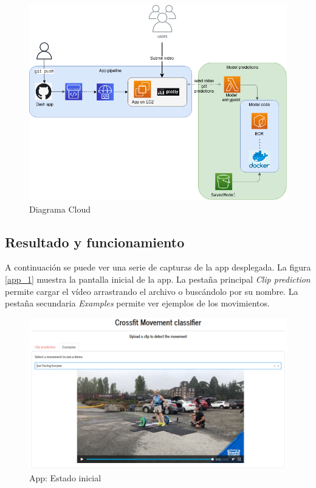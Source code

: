 \begin{figure}[H]
    \centering
		\includegraphics[width=\textwidth]{figs/cloud_diagram.png}
\caption{Diagrama Cloud}\label{cloud_diagram}


\end{figure}

\subsection{Resultado y funcionamiento}

A continuación se puede ver una serie de capturas de la app desplegada. La figura \ref{app_1} muestra la pantalla inicial de la app. La pestaña principal \textit{Clip prediction} permite cargar el vídeo arrastrando el archivo o buscándolo por su nombre. La pestaña secundaria \textit{Examples} permite ver ejemplos de los movimientos. 

\begin{figure}[H]
    \centering
		\includegraphics[width=\textwidth]{figs/bar-facing_burpee_example_app.png}
\caption{App: Estado inicial}\label{app_example}
\end{figure}


